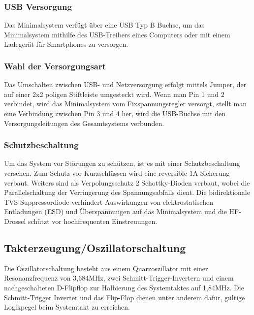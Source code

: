 \subsubsection{USB Versorgung}
Das Minimalsystem verfügt über eine USB Typ B Buchse, um das Minimalsystem mithilfe des USB-Treibers eines Computers oder mit einem Ladegerät für Smartphones zu versorgen.

\subsubsection{Wahl der Versorgungsart}
Das Umschalten zwischen USB- und Netzversorgung erfolgt mittels Jumper, der auf einer 2x2 poligen Stiftleiste umgesteckt wird. Wenn man Pin 1 und 2 verbindet, wird das Minimalsystem vom Fixspannungsregler versorgt, stellt man eine Verbindung zwischen Pin 3 und 4 her, wird die USB-Buchse mit den Versorgungsleitungen des Gesamtsystems verbunden.

\subsubsection{Schutzbeschaltung}
Um das System vor Störungen zu schützen, ist es mit einer Schutzbeschaltung versehen. Zum Schutz vor Kurzschlüssen wird eine reversible 1A Sicherung verbaut. Weiters sind als Verpolungsschutz 2 Schottky-Dioden verbaut, wobei die Parallelschaltung der Verringerung des Spannungsabfalls dient. Die bidirektionale TVS Suppressordiode verhindert Auswirkungen von elektrostatischen Entladungen (ESD) und Überspannungen auf das Minimalsystem und die HF-Drossel schützt vor hochfrequenten Einstreuungen.

\subsection{Takterzeugung/Oszillatorschaltung}
Die Oszillatorschaltung besteht aus einem Quarzoszillator mit einer Resonanzfrequenz von 3,684MHz, zwei Schmitt-Trigger-Invertern und einem nachgeschalteten D-Flipflop zur Halbierung des Systemtaktes auf 1,84MHz. Die Schmitt-Trigger Inverter und das Flip-Flop dienen unter anderem dafür, gültige Logikpegel beim Systemtakt zu erreichen.

